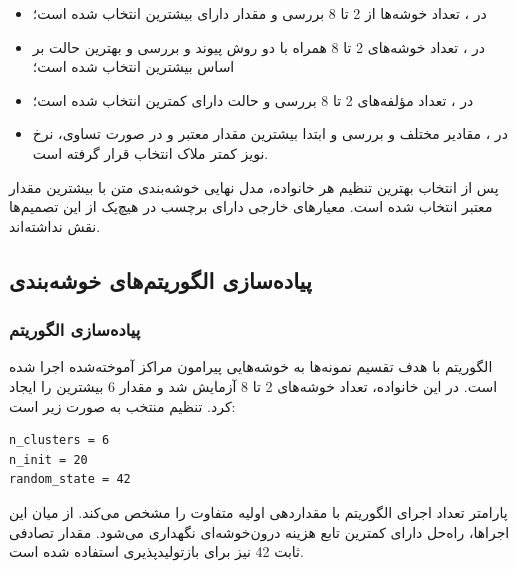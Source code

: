 \documentclass[12pt,a4paper,oneside]{report}
\begin{document}
\begin{itemize}
	\item در
	،
	تعداد خوشه‌ها از 2 تا 8 بررسی و مقدار دارای بیشترین
	انتخاب شده است؛

	\item در
	،
	تعداد خوشه‌های 2 تا 8 همراه با دو روش پیوند
	و
	بررسی و بهترین حالت بر اساس بیشترین
	انتخاب شده است؛

	\item در
	،
	تعداد مؤلفه‌های 2 تا 8 بررسی و حالت دارای کمترین
	انتخاب شده است؛

	\item در
	،
	مقادیر مختلف
	و
	بررسی و ابتدا بیشترین مقدار معتبر
	و در صورت تساوی، نرخ نویز کمتر ملاک انتخاب قرار گرفته است.
\end{itemize}

پس از انتخاب بهترین تنظیم هر خانواده، مدل نهایی خوشه‌بندی متن با بیشترین مقدار معتبر
انتخاب شده است. معیارهای خارجی دارای برچسب در هیچ‌یک از این تصمیم‌ها نقش نداشته‌اند.


\subsection{پیاده‌سازی الگوریتم‌های خوشه‌بندی}


\subsubsection{پیاده‌سازی الگوریتم }

الگوریتم
با هدف تقسیم نمونه‌ها به خوشه‌هایی پیرامون مراکز آموخته‌شده اجرا شده است. در این خانواده، تعداد خوشه‌های 2 تا 8 آزمایش شد و مقدار 6 بیشترین
را ایجاد کرد. تنظیم منتخب به صورت زیر است:

\begin{latin}
\begin{verbatim}
n_clusters = 6
n_init = 20
random_state = 42
\end{verbatim}
\end{latin}

پارامتر
تعداد اجرای الگوریتم با مقداردهی اولیه متفاوت را مشخص می‌کند. از میان این اجراها، راه‌حل دارای کمترین تابع هزینه درون‌خوشه‌ای نگهداری می‌شود. مقدار تصادفی ثابت 42 نیز برای بازتولیدپذیری استفاده شده است.
\end{document}
